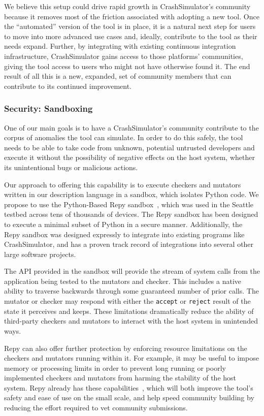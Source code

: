 We believe this setup could drive rapid growth in CrashSimulator's
community because it removes most of the friction associated with adopting
a new tool.  Once the ``automated'' version of the tool is in place, it is a
natural next step for users to move into more advanced use cases and,
ideally, contribute to the tool as their needs expand.  Further, by
integrating with existing continuous integration infrastructure,
CrashSimulator gains access to those platforms' communities, giving the tool access to users who might not have otherwise found it.  The end result of all this is a new, expanded, set of community
members that can contribute to its continued improvement.


\subsubsection{Security: Sandboxing}

One of our main goals is to have a
CrashSimulator's community contribute to the corpus of anomalies the tool
can simulate.  In order to do this safely, the tool needs to be able to
take code from unknown, potential untrusted developers and execute it
without the possibility of negative effects on the host system, whether its unintentional bugs or
malicious actions.  

Our approach to offering this capability is
to execute checkers and mutators written in our description language in a
sandbox, which isolates Python code.  We propose to use the Python-Based Repy 
sandbox~\cite{Cappos_CCS_2010}, which was used in the 
Seattle testbed across tens of thousands of devices.  The Repy sandbox
has been designed to execute a minimal subset of Python in a secure manner.
Additionally, the Repy sandbox was designed expressly to integrate into 
existing programs like CrashSimulator, and has a proven track record of integrations into several
other large software projects.


The API provided in the sandbox will provide the
stream of system calls from the application being tested to the mutators and checker.  This includes
a native ability to traverse backwards through some guaranteed number of prior
calls.  The mutator or checker may respond with either the {\tt accept} or
{\tt reject} result of the state it perceives and keeps.  These limitations
dramatically reduce the ability of third-party checkers and mutators to
interact with the host system in unintended ways.

Repy can also offer further protection by enforcing resource limitations on 
the checkers and mutators running within it.  For example,
it may be useful to impose memory or processing limits in order to prevent
long running or poorly implemented checkers and mutators from harming the
stability of the host system.  Repy already has these 
capabilities~\cite{Li_USENIX_2015}, which will both improve the
tool's safety and ease of use on the small scale, and help speed
community building by reducing the effort required to vet
community submissions.

